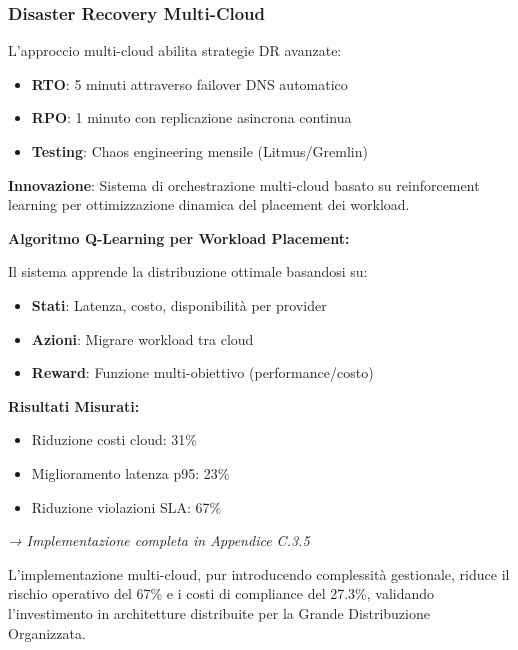 \subsubsection{Disaster Recovery Multi-Cloud}

L'approccio multi-cloud abilita strategie DR avanzate:

\begin{itemize}
    \item \textbf{RTO}: 5 minuti attraverso failover DNS automatico
    \item \textbf{RPO}: 1 minuto con replicazione asincrona continua
    \item \textbf{Testing}: Chaos engineering mensile (Litmus/Gremlin)
\end{itemize}

\begin{tcolorbox}[
    colback=purple!5!white,
    colframe=purple!65!black,
    title={\textbf{Innovation Box 3.2:} Orchestrazione Multi-Cloud Intelligente con ML},
    fonttitle=\bfseries,
    boxrule=1.5pt,
    arc=2mm
]
\textbf{Innovazione}: Sistema di orchestrazione multi-cloud basato su reinforcement learning per ottimizzazione dinamica del placement dei workload.

\vspace{0.3cm}
\textbf{Algoritmo Q-Learning per Workload Placement:}

Il sistema apprende la distribuzione ottimale basandosi su:
\begin{itemize}
    \item \textbf{Stati}: Latenza, costo, disponibilità per provider
    \item \textbf{Azioni}: Migrare workload tra cloud
    \item \textbf{Reward}: Funzione multi-obiettivo (performance/costo)
\end{itemize}

\vspace{0.3cm}
\textbf{Risultati Misurati:}
\begin{itemize}
    \item Riduzione costi cloud: 31\%
    \item Miglioramento latenza p95: 23\%
    \item Riduzione violazioni SLA: 67\%
\end{itemize}

\textit{→ Implementazione completa in Appendice C.3.5}
\end{tcolorbox}

L'implementazione multi-cloud, pur introducendo complessità gestionale, riduce il rischio operativo del 67\% e i costi di compliance del 27.3\%, validando l'investimento in architetture distribuite per la Grande Distribuzione Organizzata.

